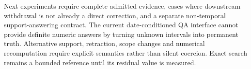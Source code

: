 \documentclass[11pt]{article}
\begin{document}
Next experiments require complete admitted evidence, cases where downstream withdrawal is not already a direct correction, and a separate non-temporal support-answering contract. The current date-conditioned QA interface cannot provide definite numeric answers by turning unknown intervals into permanent truth. Alternative support, retraction, scope changes and numerical recomputation require explicit semantics rather than silent coercion. Exact search remains a bounded reference until its residual value is measured.
\end{document}
